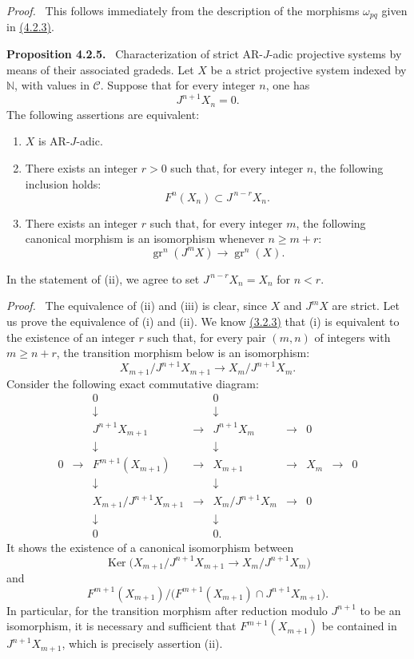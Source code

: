 \documentclass[11pt]{article}
\newenvironment{statement}[1]{\par\medskip\noindent\textbf{#1.}\ }{\par\medskip}
\newenvironment{prooftext}[1][Proof]{\par\noindent\emph{#1.}\ }{\par\medskip}
\providecommand{\Ker}{\operatorname{Ker}}
\providecommand{\gr}{\operatorname{gr}}
\providecommand{\Ker}{\operatorname{Ker}}
\providecommand{\gr}{\operatorname{gr}}
\providecommand{\gr}{\operatorname{gr}}
\providecommand{\Ker}{\operatorname{Ker}}
\begin{document}
\begin{prooftext}
This follows immediately from the description of the morphisms \(\omega_{pq}\) given in \hyperref[sga5:V:subsubsection:4.2.3]{(4.2.3)}.
\end{prooftext}

\label{sga5:V:proposition:4.2.5}\begin{statement}{Proposition 4.2.5}
Characterization of strict AR-\(J\)-adic projective systems by means of their associated gradeds. Let \(X\) be a strict projective system indexed by \(\mathbb N\), with values in \(\mathcal C\). Suppose that for every integer \(n\), one has
\[
J^{n+1}X_n=0.
\]
The following assertions are equivalent:
\begin{enumerate}[label=\textup{(\roman*)}]
\item \(X\) is AR-\(J\)-adic.
\item There exists an integer \(r>0\) such that, for every integer \(n\), the following inclusion holds:
\[
F^n(X_n)\subset J^{\,n-r}X_n.
\]
\item There exists an integer \(r\) such that, for every integer \(m\), the following canonical morphism is an isomorphism whenever \(n\ge m+r\):
\[
\gr^n(J^mX)\longrightarrow \gr^n(X).
\]
\end{enumerate}
In the statement of (ii), we agree to set \(J^{\,n-r}X_n=X_n\) for \(n<r\).
\end{statement}

\begin{prooftext}
The equivalence of (ii) and (iii) is clear, since \(X\) and \(J^mX\) are strict. Let us prove the equivalence of (i) and (ii). We know \hyperref[sga5:V:proposition:3.2.3]{(3.2.3)} that (i) is equivalent to the existence of an integer \(r\) such that, for every pair \((m,n)\) of integers with \(m\ge n+r\), the transition morphism below is an isomorphism:
\[
X_{m+1}/J^{n+1}X_{m+1}\longrightarrow X_m/J^{n+1}X_m.
\]
Consider the following exact commutative diagram:
\[
\begin{array}{ccccccccccc}
&&0&&0\\
&&\downarrow&&\downarrow\\
&&J^{n+1}X_{m+1}&\longrightarrow&J^{n+1}X_m&\longrightarrow&0\\
&&\downarrow&&\downarrow\\
0&\longrightarrow&F^{m+1}(X_{m+1})&\longrightarrow&X_{m+1}&\longrightarrow&X_m&\longrightarrow&0\\
&&\downarrow&&\downarrow\\
&&X_{m+1}/J^{n+1}X_{m+1}&\longrightarrow&X_m/J^{n+1}X_m&\longrightarrow&0\\
&&\downarrow&&\downarrow\\
&&0&&0 .
\end{array}
\]
It shows the existence of a canonical isomorphism between
\[
\Ker\bigl(X_{m+1}/J^{n+1}X_{m+1}
       \longrightarrow X_m/J^{n+1}X_m\bigr)
\]
and
\[
F^{m+1}(X_{m+1})/
\bigl(F^{m+1}(X_{m+1})\cap J^{n+1}X_{m+1}\bigr).
\]
In particular, for the transition morphism after reduction modulo \(J^{n+1}\) to be an isomorphism, it is necessary and sufficient that \(F^{m+1}(X_{m+1})\) be contained in \(J^{n+1}X_{m+1}\), which is precisely assertion (ii).
\end{prooftext}
\end{document}
